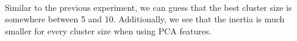 \documentclass[11pt]{article}
\begin{document}
    \begin{center}
    \end{center}
    { \hspace*{\fill} \\}
    
    Similar to the previous experiment, we can guess that the best cluster
size is somewhere between 5 and 10. Additionally, we see that the
inertia is much smaller for every cluster size when using PCA features.


    
    
    
\end{document}
